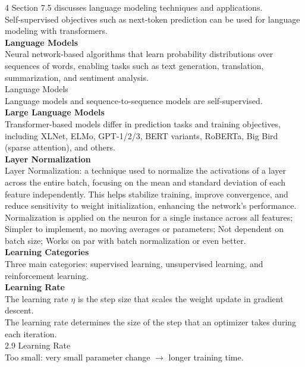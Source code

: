 \documentclass[8pt]{extarticle}
\begin{document}
\begin{multicols}{4}
Section 7.5 discusses language modeling techniques and applications.\\
Self-supervised objectives such as next-token prediction can be used for language modeling with transformers.\\
\vspace{2pt}\textbf{Language Models}\\
Neural network-based algorithms that learn probability distributions over sequences of words, enabling tasks such as text generation, translation, summarization, and sentiment analysis.\\
Language Models\\
Language models and sequence-to-sequence models are self-supervised.\\
\vspace{2pt}\textbf{Large Language Models}\\
Transformer-based models differ in prediction tasks and training objectives, including XLNet, ELMo, GPT-1/2/3, BERT variants, RoBERTa, Big Bird (sparse attention), and others.\\
\vspace{2pt}\textbf{Layer Normalization}\\
Layer Normalization: a technique used to normalize the activations of a layer across the entire batch, focusing on the mean and standard deviation of each feature independently. This helps stabilize training, improve convergence, and reduce sensitivity to weight initialization, enhancing the network's performance.\\
Normalization is applied on the neuron for a single instance across all features; Simpler to implement, no moving averages or parameters; Not dependent on batch size; Works on par with batch normalization or even better.\\
\vspace{2pt}\textbf{Learning Categories}\\
Three main categories: supervised learning, unsupervised learning, and reinforcement learning.\\
\vspace{2pt}\textbf{Learning Rate}\\
The learning rate $\eta$ is the step size that scales the weight update in gradient descent.\\
The learning rate determines the size of the step that an optimizer takes during each iteration.\\
2.9 Learning Rate\\
Too small: very small parameter change $\rightarrow$ longer training time.\\

\end{multicols}
\end{document}
